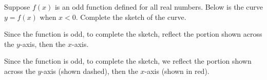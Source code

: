 \begin{Mquestion}
Suppose $f(x)$ is an odd function defined for all real numbers. Below is the curve $y=f(x)$ when $x<0$. Complete the sketch of the curve.
\begin{center}\end{center}
\end{Mquestion}
\begin{hint}
Since the function is odd, to complete the sketch, reflect the portion shown across the $y$-axis, then the $x$-axis.
\end{hint}
\begin{answer}
\begin{center}\end{center}
\end{answer}
\begin{solution}
Since the function is odd, to complete the sketch, we reflect the portion shown across the $y$-axis (shown dashed), then the $x$-axis (shown in red).
\begin{center}
\end{center}
\end{solution}

\subsection*{\Procedural}


